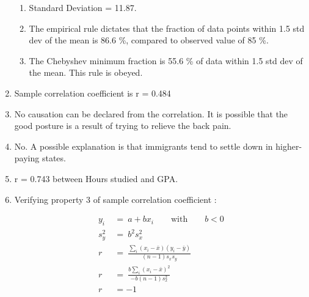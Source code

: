 \begin{enumerate}
\begin{enumerate}
		\item Standard Deviation = 11.87. \\
		
		\item The empirical rule dictates that the fraction of data points within 1.5 std dev of the mean is 86.6 \%, compared to observed value of 85 \%. \\
		
		\item The Chebyshev minimum fraction is 55.6 \% of data within 1.5 std dev of the mean. This rule is obeyed. \\
	\end{enumerate}
	
	\item Sample correlation coefficient is r = 0.484 \\
	
	\begin{figure}[H]
		\centering
	\end{figure}
	
	\item No causation can be declared from the correlation. It is possible that the good posture is a result of trying to relieve the back pain. \\
	
	\item No. A possible explanation is that immigrants tend to settle down in higher-paying states. \\
	
	\item r = 0.743 between Hours studied and GPA. \\
	
	\item 	Verifying property 3 of sample correlation coefficient : 
	
	
		\begin{align}
			y_i \ &=\  a + b x_i \qquad \text{with} \qquad b < 0 \\
			s_{y}^{2} \ &=\ b^2 s_{x}^2 \\
			r \ &=\ \frac{\sum_{i} (x_i - \bar{x}) (y_i - \bar{y})}{(n - 1) s_x s_y} \\
			r \ &=\ \frac{b \sum_{i} (x_i - \bar{x})^{2}}{- b (n - 1) s_{x}^{2}} \\
			r &= -1			
		\end{align}
	\\
	

\end{enumerate}
